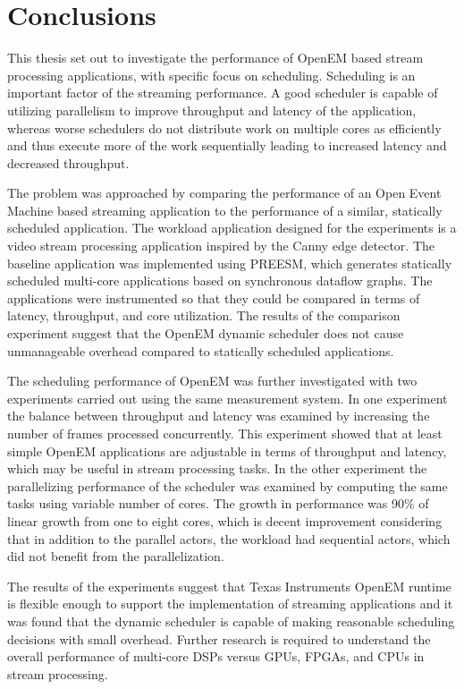 \chapter{Conclusions}
\label{chapter:conclusion}
This thesis set out to investigate the performance of OpenEM based stream processing applications, with specific focus on scheduling. Scheduling is an important factor of the streaming performance. A good scheduler is capable of utilizing parallelism to improve throughput and latency of the application, whereas worse schedulers do not distribute work on multiple cores as efficiently and thus execute more of the work sequentially leading to increased latency and decreased throughput.

The problem was approached by comparing the performance of an Open Event Machine based streaming application to the performance of a similar, statically scheduled application. The workload application designed for the experiments is a video stream processing application inspired by the Canny edge detector. The baseline application was implemented using PREESM, which generates statically scheduled multi-core applications based on synchronous dataflow graphs. The applications were instrumented so that they could be compared in terms of latency, throughput, and core utilization. The results of the comparison experiment suggest that the OpenEM dynamic scheduler does not cause unmanageable overhead compared to statically scheduled applications.

The scheduling performance of OpenEM was further investigated with two experiments carried out using the same measurement system. In one experiment the balance between throughput and latency was examined by increasing the number of frames processed concurrently. This experiment showed that at least simple OpenEM applications are adjustable in terms of throughput and latency, which may be useful in stream processing tasks. In the other experiment the parallelizing performance of the scheduler was examined by computing the same tasks using variable number of cores. The growth in performance was 90\% of linear growth from one to eight cores, which is decent improvement considering that in addition to the parallel actors, the workload had sequential actors, which did not benefit from the parallelization.

The results of the experiments suggest that Texas Instruments OpenEM runtime is flexible enough to support the implementation of streaming applications and it was found that the dynamic scheduler is capable of making reasonable scheduling decisions with small overhead. Further research is required to understand the overall performance of multi-core DSPs versus GPUs, FPGAs, and CPUs in stream processing.


